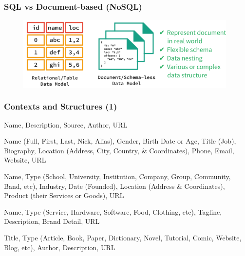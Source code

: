 \documentclass[10pt, compress]{beamer}
\begin{document}
\begin{frame}[fragile]
  \frametitle{SQL vs Document-based (NoSQL)}

  \begin{figure}[ht]
    \centering
    \vspace{-25pt}
    \includegraphics[width=11cm]{include/literature-nosql.png}
    \vspace{-10pt}
    \label{fig:literature-nosql}
  \end{figure}

\end{frame}


\begin{frame}[fragile]
  \frametitle{Contexts and Structures (1)}

  \begin{description} \itemsep0pt
    \item[Definition] Name, Description, Source, Author, URL
    \item[Person] Name (Full, First, Last, Nick, Alias), Gender, Birth Date or Age, Title (Job), Biography, Location (Address, City, Country, \& Coordinates), Phone, Email, Website, URL
    \item[Organization] Name, Type (School, University, Institution, Company, Group, Community, Band, etc), Industry, Date (Founded), Location (Address \& Coordinates), Product (their Services or Goods), URL
    \item[Product] Name, Type (Service, Hardware, Software, Food, Clothing, etc), Tagline, Description, Brand Detail, URL
    \item[Publication] Title, Type (Article, Book, Paper, Dictionary, Novel, Tutorial, Comic, Website, Blog, etc), Author, Description, URL
  \end{description}

\end{frame}

\end{document}
